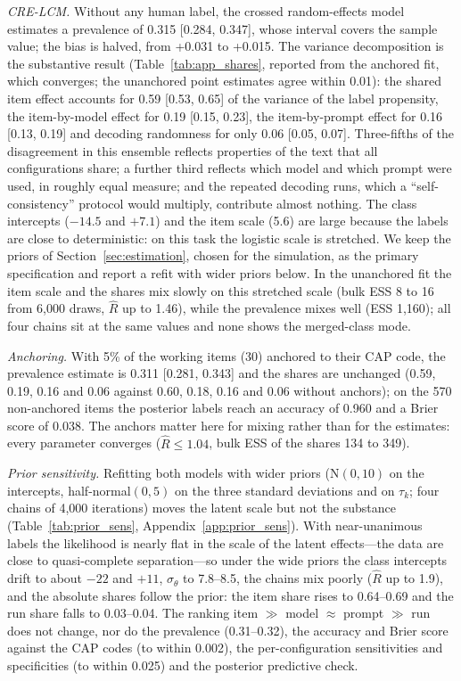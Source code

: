 \emph{CRE-LCM.} Without any human label, the crossed random-effects model estimates a prevalence
of 0.315 [0.284, 0.347], whose interval covers the sample value; the bias is halved, from +0.031
to +0.015. The variance decomposition is the substantive result (Table~\ref{tab:app_shares},
reported from the anchored fit, which converges; the unanchored point estimates agree within
0.01): the shared item effect accounts for 0.59 [0.53, 0.65] of the variance of the
label propensity, the item-by-model effect for 0.19 [0.15, 0.23], the item-by-prompt effect for
0.16 [0.13, 0.19] and decoding randomness for only 0.06 [0.05, 0.07]. Three-fifths of the
disagreement in this ensemble reflects properties of the text that all configurations share; a
further third reflects which model and which prompt were used, in roughly equal measure; and the
repeated decoding runs, which a ``self-consistency'' protocol would multiply, contribute almost
nothing. The class intercepts ($-14.5$ and $+7.1$) and the item scale (5.6) are large because the
labels are close to deterministic: on this task the logistic scale is stretched. We keep the
priors of Section~\ref{sec:estimation}, chosen for the simulation, as the primary specification
and report a refit with wider priors below. In the unanchored fit the item scale and the shares
mix slowly on this stretched scale (bulk ESS 8 to 16 from 6,000 draws, $\widehat{R}$ up to 1.46),
while the prevalence mixes well (ESS 1,160); all four chains sit at the same values and none shows
the merged-class mode.

\emph{Anchoring.} With 5\% of the working items (30) anchored to their CAP code, the prevalence
estimate is 0.311 [0.281, 0.343] and the shares are unchanged (0.59, 0.19, 0.16 and 0.06 against
0.60, 0.18, 0.16 and 0.06 without anchors); on the 570 non-anchored items the posterior labels
reach an accuracy of 0.960 and a Brier score of 0.038. The anchors matter here for mixing rather
than for the estimates: every parameter converges ($\widehat{R} \le 1.04$, bulk ESS of the shares
134 to 349).

\emph{Prior sensitivity.} Refitting both models with wider priors ($\mathrm{N}(0, 10)$ on the
intercepts, half-normal$(0, 5)$ on the three standard deviations and on $\tau_k$; four chains of
4,000 iterations) moves the latent scale but not the substance
(Table~\ref{tab:prior_sens}, Appendix~\ref{app:prior_sens}). With near-unanimous labels the
likelihood is nearly flat in the scale of the latent effects---the data are close to
quasi-complete separation---so under the wide priors the class intercepts drift to about $-22$
and $+11$, $\sigma_\theta$ to 7.8--8.5, the chains mix poorly ($\widehat{R}$ up to 1.9), and the
absolute shares follow the prior: the item share rises to 0.64--0.69 and the run share falls to
0.03--0.04. The ranking item $\gg$ model $\approx$ prompt $\gg$ run does not change, nor do the
prevalence (0.31--0.32), the accuracy and Brier score against the CAP codes (to within 0.002), the
per-configuration sensitivities and specificities (to within 0.025) and the posterior predictive
check.

